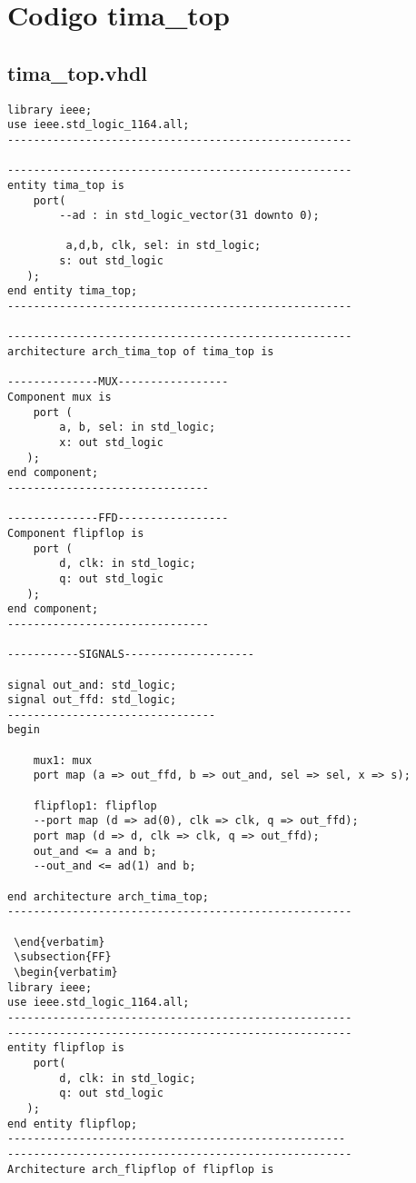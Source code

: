 \chapter{Codigo tima\_top}\label{aped.B}

\section{tima\_top.vhdl}
    
\begin{lstlisting}
library ieee;
use ieee.std_logic_1164.all;
-----------------------------------------------------

-----------------------------------------------------
entity tima_top is
    port(
        --ad : in std_logic_vector(31 downto 0);
        
         a,d,b, clk, sel: in std_logic;
        s: out std_logic
   );
end entity tima_top;
-----------------------------------------------------

-----------------------------------------------------
architecture arch_tima_top of tima_top is

--------------MUX-----------------
Component mux is
    port (
        a, b, sel: in std_logic;
        x: out std_logic
   );
end component;
-------------------------------

--------------FFD-----------------
Component flipflop is
    port (
        d, clk: in std_logic;
        q: out std_logic
   );
end component;
-------------------------------

-----------SIGNALS--------------------

signal out_and: std_logic;
signal out_ffd: std_logic;
--------------------------------
begin

    mux1: mux
    port map (a => out_ffd, b => out_and, sel => sel, x => s);
    
    flipflop1: flipflop
    --port map (d => ad(0), clk => clk, q => out_ffd);
    port map (d => d, clk => clk, q => out_ffd);
    out_and <= a and b;
    --out_and <= ad(1) and b;

end architecture arch_tima_top;
-----------------------------------------------------

 \end{verbatim}
 \subsection{FF}
 \begin{verbatim}
library ieee;
use ieee.std_logic_1164.all;
-----------------------------------------------------
-----------------------------------------------------
entity flipflop is
    port(
        d, clk: in std_logic;
        q: out std_logic
   );
end entity flipflop;
----------------------------------------------------
-----------------------------------------------------
Architecture arch_flipflop of flipflop is 


\end{lstlisting}
